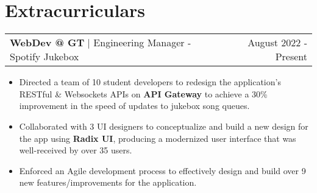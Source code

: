 \documentclass[letterpaper,11pt]{article}
\makeatletter
\newcommand{\resumeExperienceHeading}[3]{
    \begin{tabular*}{0.99\textwidth}[t]{l@{\extracolsep{\fill}}r}
      \textbf{#1} $\vert$ {#2} & {#3} \\
    \end{tabular*}\vspace{-3pt}
}
\newcommand{\resumeItemListStart}{\begin{itemize}[noitemsep]\vspace{-4pt}}
\newcommand{\resumeItemListEnd}{\end{itemize}}
\makeatother
\begin{document}
\section{Extracurriculars}
  \resumeExperienceHeading{WebDev @ GT}{Engineering Manager - Spotify Jukebox}{August 2022 - Present}
    \resumeItemListStart
      \item {Directed a team of 10 student developers to redesign the application's RESTful \& Websockets APIs on \textbf{API Gateway} to achieve a 30\% improvement in the speed of updates to jukebox song queues.}
      \item {Collaborated with 3 UI designers to conceptualize and build a new design for the app using \textbf{Radix UI}, producing a modernized user interface that was well-received by over 35 users.}
      \item {Enforced an Agile development process to effectively design and build over 9 new features/improvements for the application.}
    \resumeItemListEnd
\end{document}
